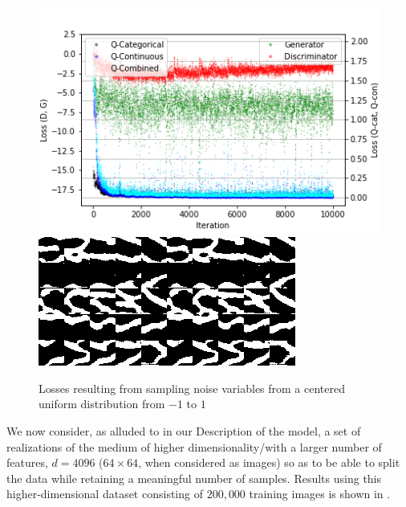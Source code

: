 \documentclass{article}
\begin{document}
\begin{figure}[h]
\centering
\includegraphics[width=\textwidth,scale=0.2]{figures/Sample_Uniform.png}
\includegraphics[width=\textwidth,scale=0.2]{figures/SampleUnifTest.png}
  \caption{Losses resulting from sampling noise variables from a centered uniform distribution from $-1$ to $1$ }
\end{figure}

We now consider, as alluded to in our Description of the model, a set of realizations of the medium of higher dimensionality/with a larger number of features, $d=4096$ ($64\times64$, when considered as images) so as to be able to split the data while retaining a meaningful number of samples.  Results using this higher-dimensional dataset consisting of $200,000$ training images is shown in \label{GenPCA2}.  
\end{document}
